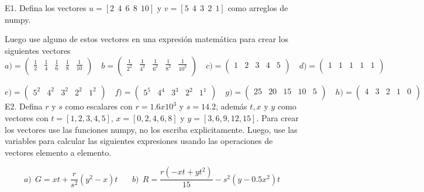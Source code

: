 \documentclass[12pt,letterpaper]{article}
\author{Andrés Limón Cruz }
\begin{document}
E1. Defina los vectores $u = [2~~4~~6~~8~~10]$ y $v = [5~~4~~3~~2~~1]$ como arreglos de numpy.

Luego use alguno de estos vectores en una expresión matemática para crear los siguientes vectores
$$
    a) = \begin{pmatrix}
        \frac{1}{2} & \frac{1}{4} & \frac{1}{6} & \frac{1}{8} & \frac{1}{10}\\
    \end{pmatrix}\quad
    b = \begin{pmatrix}
        \frac{1}{2^2} & \frac{1}{4^2} & \frac{1}{6^2} & \frac{1}{8^2} & \frac{1}{10^2}\\
    \end{pmatrix}\quad
    c) = \begin{pmatrix}
        1 & 2 & 3 & 4 & 5 \\
    \end{pmatrix}\quad
    d) = \begin{pmatrix}
        1 & 1 & 1 & 1 & 1 \\
    \end{pmatrix}\quad
$$

$$
    e) = \begin{pmatrix}
        5^2 & 4^2 & 3^2 & 2^2 & 1^2 \\
    \end{pmatrix}\quad
    f) = \begin{pmatrix}
        5^5 & 4^4 & 3^3 & 2^2 & 1^1 \\
    \end{pmatrix}\quad
    g) = \begin{pmatrix}
        25 & 20 & 15 & 10 & 5 \\
    \end{pmatrix}\quad
    h) = \begin{pmatrix}
        4 & 3 & 2 & 1 & 0 \\
    \end{pmatrix}\quad
$$
E2. Defina $r$ y $s$ como escalares con $r= 1.6 x 10^3$ y $ s = 14.2$, además $t,x$ y $y$ como vectores con $t = [1,2,3,4,5]$, $x =[0,2,4,6,8]$ y $y = [3,6,9,12,15]$. Para crear los vectores use las funciones numpy, no los escriba explicitamente. Luego, use las variables para calcular las siguientes expresiones usando las operaciones de vectores elemento a elemento.

$$
a)~~G=xt+ \frac{r}{s^2} (y^2 - x)t~~~~~~~~b)~~R= \dfrac{r(-xt+yt^2)}{15}-s^2(y-0.5x^2)t
$$
\end{document}
